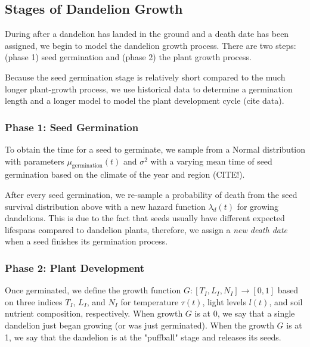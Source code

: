 \subsection{Stages of Dandelion Growth}

During after a dandelion has landed in the ground and a death date has been assigned, we begin to model the dandelion growth process. There are two steps: (phase 1) seed germination and (phase 2) the plant growth process.

Because the seed germination stage is relatively short compared to the much longer plant-growth process, we use historical data to determine a germination length and a longer model to model the plant development cycle (cite data).


\subsubsection{Phase 1: Seed Germination}

To obtain the time for a seed to germinate, we sample from a Normal distribution with parameters \(\mu_{\text{germination}}(t)\) and \(\sigma^2\) with a varying mean time of seed germination based on the climate of the year and region (CITE!).

After every seed germination, we re-sample a probability of death from the seed survival distribution above with a new hazard function \(\lambda_d(t)\) for growing dandelions. This is due to the fact that seeds usually have different expected lifespans compared to dandelion plants, therefore, we assign a \textit{new death date} when a seed finishes its germination process.


\subsubsection{Phase 2: Plant Development}

Once germinated, we define the growth function \(G: [T_I, L_I, N_I] \longrightarrow [0, 1]\) based on three indices \(T_I\), \(L_I\), and \(N_I\) for temperature \(\tau(t)\), light levels \(l(t)\), and soil nutrient composition, respectively. When growth \(G\) is at 0, we say that a single dandelion just began growing (or was just germinated). When the growth \(G\) is at 1, we say that the dandelion is at the "puffball" stage and releases its seeds.

